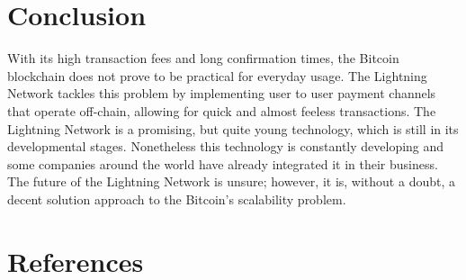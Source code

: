 \documentclass[a4paper, 12pt]{report}
\begin{document}
\chapter{Conclusion}

\par With its high transaction fees and long confirmation times, the Bitcoin blockchain does not prove to be practical for everyday usage. The Lightning Network tackles this problem by implementing user to user payment channels that operate off-chain, allowing for quick and almost feeless transactions. The Lightning Network is a promising, but quite young technology, which is still in its developmental stages. Nonetheless this technology is constantly developing and some companies around the world have already integrated it in their business. The future of the Lightning Network is unsure; however, it is, without a doubt, a decent solution approach to the Bitcoin’s scalability problem.

\chapter{References}
\end{document}
